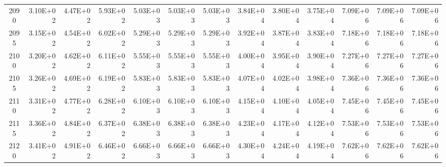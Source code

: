 \documentclass{article}
\begin{document}
\begin{table}
\begin{tabular}{crrr|rrr|rrr|rrr}
2090     & 3.10E+02 & 4.47E+02 & 5.93E+02 & 5.03E+03 & 5.03E+03 & 5.03E+03 & 3.84E+04 & 3.80E+04 & 3.75E+04 & 7.09E+06 & 7.09E+06 & 7.09E+06 \\
2095     & 3.15E+02 & 4.54E+02 & 6.02E+02 & 5.29E+03 & 5.29E+03 & 5.29E+03 & 3.92E+04 & 3.87E+04 & 3.83E+04 & 7.18E+06 & 7.18E+06 & 7.18E+06 \\
2100     & 3.20E+02 & 4.62E+02 & 6.11E+02 & 5.55E+03 & 5.55E+03 & 5.55E+03 & 4.00E+04 & 3.95E+04 & 3.90E+04 & 7.27E+06 & 7.27E+06 & 7.27E+06 \\
2105     & 3.26E+02 & 4.69E+02 & 6.19E+02 & 5.83E+03 & 5.83E+03 & 5.83E+03 & 4.07E+04 & 4.02E+04 & 3.98E+04 & 7.36E+06 & 7.36E+06 & 7.36E+06 \\
2110     & 3.31E+02 & 4.77E+02 & 6.28E+02 & 6.10E+03 & 6.10E+03 & 6.10E+03 & 4.15E+04 & 4.10E+04 & 4.05E+04 & 7.45E+06 & 7.45E+06 & 7.45E+06 \\
2115     & 3.36E+02 & 4.84E+02 & 6.37E+02 & 6.38E+03 & 6.38E+03 & 6.38E+03 & 4.23E+04 & 4.17E+04 & 4.12E+04 & 7.53E+06 & 7.53E+06 & 7.53E+06 \\
2120     & 3.41E+02 & 4.91E+02 & 6.46E+02 & 6.66E+03 & 6.66E+03 & 6.66E+03 & 4.30E+04 & 4.24E+04 & 4.19E+04 & 7.62E+06 & 7.62E+06 & 7.62E+06
\end{tabular} 
\end{table}
\end{document}
